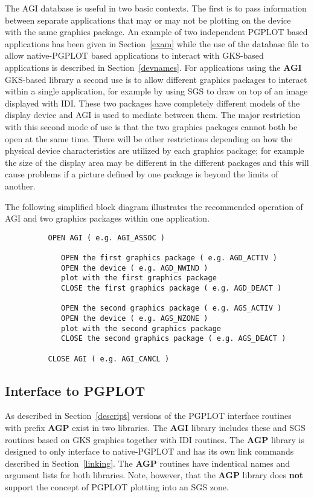 \documentclass[twoside,11pt]{article}
\newcommand{\hyperref}[4]{#2\ref{#4}#3}
\renewcommand{\_}{\texttt{\symbol{95}}}
\begin{document}
The AGI database is useful in two basic contexts. The first is to pass
information between separate applications that may or may not be
plotting on the device with the same graphics package. An example of two
independent PGPLOT based applications has been given
\hyperref{earlier}{in Section~}{}{exam} while the use of the database file
to allow native-PGPLOT based applications to interact with GKS-based
applications is described \hyperref{here}{in Section~}{}{devnames}.
For applications using the {\bf AGI} GKS-based library a second use is
to allow different graphics packages to interact within a single
application, for example by using SGS to draw on top of an image
displayed with IDI. These two packages have completely different
models of the display device and AGI is used to mediate between them.
The major restriction with this second mode of use is that the two
graphics packages cannot both be open at the same time. There will be
other restrictions depending on how the physical device
characteristics are utilized by each graphics package; for example the
size of the display area may be different in the different packages
and this will cause problems if a picture defined by one package is
beyond the limits of another.

The following simplified block diagram illustrates the recommended operation
of AGI and two graphics packages within one application.
\begin{verbatim}
          OPEN AGI ( e.g. AGI_ASSOC )

             OPEN the first graphics package ( e.g. AGD_ACTIV )
             OPEN the device ( e.g. AGD_NWIND )
             plot with the first graphics package
             CLOSE the first graphics package ( e.g. AGD_DEACT )

             OPEN the second graphics package ( e.g. AGS_ACTIV )
             OPEN the device ( e.g. AGS_NZONE )
             plot with the second graphics package
             CLOSE the second graphics package ( e.g. AGS_DEACT )

          CLOSE AGI ( e.g. AGI_CANCL )
\end{verbatim}

\subsection{Interface to PGPLOT}

As described \hyperref{previously}{in Section~}{}{descript} versions
of the PGPLOT interface routines with prefix {\bf AGP\_} exist in two
libraries. The {\bf AGI} library includes these and SGS routines based
on GKS graphics together with IDI routines. The {\bf AGP} library is
designed to only interface to native-PGPLOT and has its own link
commands described \hyperref{here}{in Section~}{}{linking}. The {\bf
AGP\_} routines have indentical names and argument lists for both
libraries. Note, however, that the {\bf AGP} library does {\bf not}
support the concept of PGPLOT plotting into an SGS zone.
\end{document}
